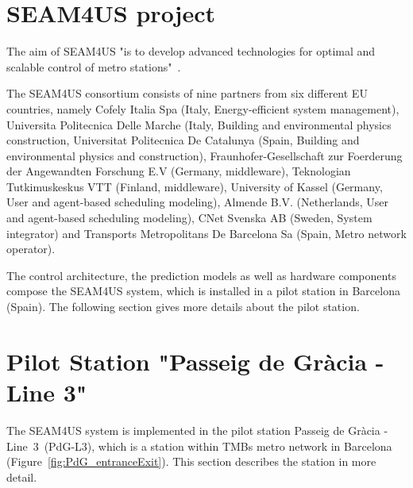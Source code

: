 
\section{SEAM4US project}
\label{sec:seam4us}
The aim of SEAM4US "is to develop advanced technologies for optimal and scalable control of metro stations"~\cite{SEAM4US_Website}.


The SEAM4US consortium consists of nine partners from six different EU countries, namely Cofely Italia Spa (Italy, Energy-efficient system management), Universita Politecnica Delle Marche (Italy, Building and environmental physics construction, Universitat Politecnica De Catalunya (Spain, Building and environmental physics and construction), Fraunhofer-Gesellschaft zur Foerderung der Angewandten Forschung E.V (Germany, middleware), Teknologian Tutkimuskeskus VTT (Finland, middleware), University of Kassel (Germany, User and agent-based scheduling modeling), Almende B.V. (Netherlands, User and agent-based scheduling modeling), CNet Svenska AB (Sweden, System integrator) and Transports Metropolitans De Barcelona Sa (Spain, Metro network operator).

The control architecture, the prediction models as well as hardware components compose the SEAM4US system, which is installed in a pilot station in Barcelona (Spain). The following section gives more details about the pilot station.


\section{Pilot Station "Passeig de Gr\`{a}cia - Line 3"}
\label{sec:station}

The SEAM4US system is implemented in the pilot station Passeig de Gr\`{a}cia - Line~3~(PdG-L3), which is a station within TMBs metro network in Barcelona (Figure~\ref{fig:PdG_entranceExit}). 
This section describes the station in more detail.

